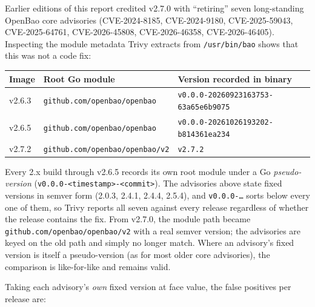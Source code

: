 \documentclass{article}
\begin{document}
Earlier editions of this report credited v2.7.0 with ``retiring'' seven long-standing OpenBao core advisories (CVE-2024-8185, CVE-2024-9180, CVE-2025-59043, CVE-2025-64761, CVE-2026-45808, CVE-2026-46358, CVE-2026-46405). Inspecting the module metadata Trivy extracts from \texttt{/usr/bin/bao} shows that this was not a code fix:

\begin{center}
{\small
\begin{tabular}{l l l}
\toprule
\textbf{Image} & \textbf{Root Go module} & \textbf{Version recorded in binary} \\
\midrule
v2.6.3 & \texttt{github.com/openbao/openbao}    & \texttt{v0.0.0-20260923163753-63a65e6b9075} \\
v2.6.5 & \texttt{github.com/openbao/openbao}    & \texttt{v0.0.0-20261026193202-b814361ea234} \\
v2.7.2 & \texttt{github.com/openbao/openbao/v2} & \texttt{v2.7.2} \\
\bottomrule
\end{tabular}
}
\end{center}

Every 2.x build through v2.6.5 records its own root module under a Go \emph{pseudo-version} (\nolinkurl{v0.0.0-<timestamp>-<commit>}). The advisories above state fixed versions in semver form (2.0.3, 2.4.1, 2.4.4, 2.5.4), and \texttt{v0.0.0-\ldots} sorts below every one of them, so Trivy reports all seven against every release regardless of whether the release contains the fix. From v2.7.0, the module path became \nolinkurl{github.com/openbao/openbao/v2} with a real semver version; the advisories are keyed on the old path and simply no longer match. Where an advisory's fixed version is itself a pseudo-version (as for most older core advisories), the comparison is like-for-like and remains valid.

Taking each advisory's \emph{own} fixed version at face value, the false positives per release are:
\end{document}
